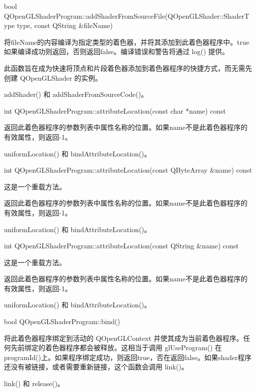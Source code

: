 bool QOpenGLShaderProgram::addShaderFromSourceFile(QOpenGLShader::ShaderType type, const QString \&fileName)

将fileName的内容编译为指定类型的着色器，并将其添加到此着色器程序中。true如果编译成功则返回，否则返回false。编译错误和警告将通过 log() 提供。

此函数旨在成为快速将顶点和片段着色器添加到着色器程序的快捷方式，而无需先创建 QOpenGLShader 的实例。


\begin{seeAlso}
addShader() 和 addShaderFromSourceCode()。
\end{seeAlso}

int QOpenGLShaderProgram::attributeLocation(const char *name) const

返回此着色器程序的参数列表中属性名称的位置。如果name不是此着色器程序的有效属性，则返回-1。


\begin{seeAlso}
uniformLocation() 和 bindAttributeLocation()。
\end{seeAlso}

int QOpenGLShaderProgram::attributeLocation(const QByteArray \&name) const

这是一个重载方法。

返回此着色器程序的参数列表中属性名称的位置。如果name不是此着色器程序的有效属性，则返回-1。

\begin{seeAlso}
uniformLocation() 和 bindAttributeLocation()。
\end{seeAlso}

int QOpenGLShaderProgram::attributeLocation(const QString \&name) const

这是一个重载方法。

返回此着色器程序的参数列表中属性名称的位置。如果name不是此着色器程序的有效属性，则返回-1。


\begin{seeAlso}
uniformLocation() 和 bindAttributeLocation()。
\end{seeAlso}

bool QOpenGLShaderProgram::bind()

将此着色器程序绑定到活动的 QOpenGLContext 并使其成为当前着色器程序。任何先前绑定的着色器程序都会被释放。这相当于调用 glUseProgram() 在 programId()上。如果程序绑定成功，则返回true，否在返回false。如果shader程序还没有被链接，或者需要重新链接，这个函数会调用 link()。


\begin{seeAlso}
link() 和 release()。
\end{seeAlso}

